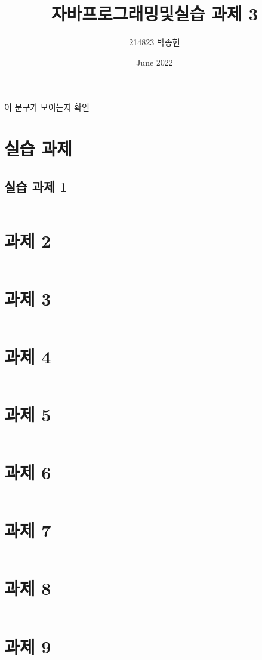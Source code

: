 \documentclass{article}
\title{자바프로그래밍및실습 과제 3}
\author{214823 박종현}
\date{June 2022}
\begin{document}
\maketitle
\pagebreak


이 문구가 보이는지 확인
\section{실습 과제}
\subsection{실습 과제 1}
\inputminted{java}{../java/Prob1/Average.java}

\section{과제 2}
\inputminted{java}{../java/Prob2.java}

\section{과제 3}
\inputminted{java}{../java/Prob3.java}

\section{과제 4}
\inputminted{java}{../java/Prob4.java}

\section{과제 5}
\inputminted{java}{../java/Prob5.java}

\section{과제 6}
\inputminted{java}{../java/Prob6.java}

\section{과제 7}
\inputminted{java}{../java/Prob7/Phonebook.java}

\section{과제 8}
\inputminted{java}{../java/Prob8/StaticEx.java}

\section{과제 9}
\inputminted{java}{../java/Prob9/DicApp.java}
\end{document}
